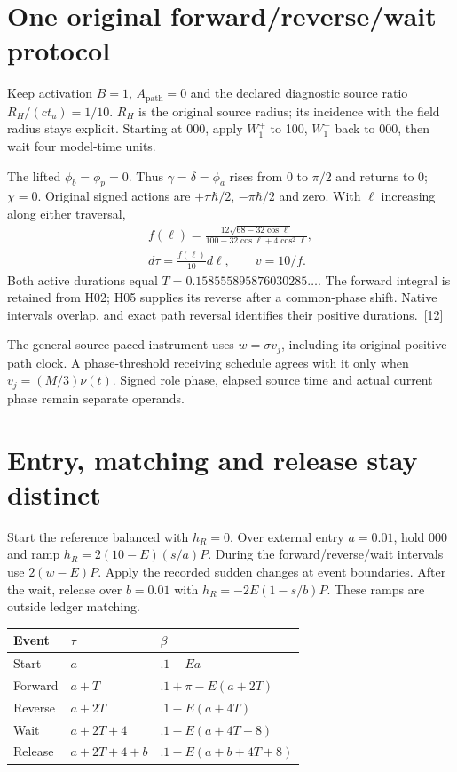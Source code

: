\documentclass[10pt,twocolumn,letterpaper]{article}
\begin{document}
\section{One original forward/reverse/wait protocol}
Keep activation $B=1$, $A_{\mathrm{path}}=0$ and the declared diagnostic source ratio $R_H/(ct_u)=1/10$. $R_H$ is the original source radius; its incidence with the field radius stays explicit. Starting at 000, apply $W_1^+$ to 100, $W_1^-$ back to 000, then wait four model-time units.

The lifted $\phi_b=\phi_p=0$. Thus $\gamma=\delta=\phi_a$ rises from $0$ to $\pi/2$ and returns to $0$; $\chi=0$. Original signed actions are $+\pi\hbar/2$, $-\pi\hbar/2$ and zero. With $\ell$ increasing along either traversal,
\[
\begin{gathered}
f(\ell)=\frac{12\sqrt{68-32\cos\ell}}{100-32\cos\ell+4\cos^2\ell},\\
d\tau=\frac{f(\ell)}{10}d\ell,\qquad v=10/f.
\end{gathered}
\]
Both active durations equal $T=0.158555895876030285\ldots$. The forward integral is retained from H02; H05 supplies its reverse after a common-phase shift. Native intervals overlap, and exact path reversal identifies their positive durations.~[12]

The general source-paced instrument uses $w=\sigma v_j$, including its original positive path clock. A phase-threshold receiving schedule agrees with it only when $v_j=(M/3)\nu(t)$. Signed role phase, elapsed source time and actual current phase remain separate operands.

\section{Entry, matching and release stay distinct}
Start the reference balanced with $h_R=0$. Over external entry $a=0.01$, hold 000 and ramp $h_R=2(10-E)(s/a)P$. During the forward/reverse/wait intervals use $2(w-E)P$. Apply the recorded sudden changes at event boundaries. After the wait, release over $b=0.01$ with $h_R=-2E(1-s/b)P$. These ramps are outside ledger matching.

\begin{center}
\scriptsize
\setlength{\tabcolsep}{3pt}
\begin{tabular}{@{}lll@{}}
\toprule
Event & $\tau$ & $\beta$\\
\midrule
Start & $a$ & $.1-Ea$\\
Forward & $a+T$ & $.1+\pi-E(a+2T)$\\
Reverse & $a+2T$ & $.1-E(a+4T)$\\
Wait & $a+2T+4$ & $.1-E(a+4T+8)$\\
Release & $a+2T+4+b$ & $.1-E(a+b+4T+8)$\\
\bottomrule
\end{tabular}
\end{center}
\end{document}
